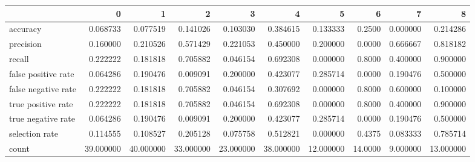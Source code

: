\begin{tabular}{lrrrrrrrrr}
\toprule
{} &          0 &          1 &          2 &          3 &          4 &          5 &        6 &         7 &          8 \\
\midrule
accuracy            &   0.068733 &   0.077519 &   0.141026 &   0.103030 &   0.384615 &   0.133333 &   0.2500 &  0.000000 &   0.214286 \\
precision           &   0.160000 &   0.210526 &   0.571429 &   0.221053 &   0.450000 &   0.200000 &   0.0000 &  0.666667 &   0.818182 \\
recall              &   0.222222 &   0.181818 &   0.705882 &   0.046154 &   0.692308 &   0.000000 &   0.8000 &  0.400000 &   0.900000 \\
false positive rate &   0.064286 &   0.190476 &   0.009091 &   0.200000 &   0.423077 &   0.285714 &   0.0000 &  0.190476 &   0.500000 \\
false negative rate &   0.222222 &   0.181818 &   0.705882 &   0.046154 &   0.307692 &   0.000000 &   0.8000 &  0.600000 &   0.100000 \\
true positive rate  &   0.222222 &   0.181818 &   0.705882 &   0.046154 &   0.692308 &   0.000000 &   0.8000 &  0.400000 &   0.900000 \\
true negative rate  &   0.064286 &   0.190476 &   0.009091 &   0.200000 &   0.423077 &   0.285714 &   0.0000 &  0.190476 &   0.500000 \\
selection rate      &   0.114555 &   0.108527 &   0.205128 &   0.075758 &   0.512821 &   0.000000 &   0.4375 &  0.083333 &   0.785714 \\
count               &  39.000000 &  40.000000 &  33.000000 &  23.000000 &  38.000000 &  12.000000 &  14.0000 &  9.000000 &  13.000000 \\
\bottomrule
\end{tabular}
